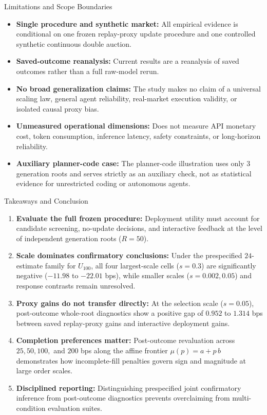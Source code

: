 \documentclass[10pt,aspectratio=169]{beamer}
\begin{document}
\begin{frame}{Limitations and Scope Boundaries}
  \begin{itemize}
    \item \textbf{Single procedure and synthetic market:} All empirical evidence is conditional on one frozen replay-proxy update procedure and one controlled synthetic continuous double auction.
    \item \textbf{Saved-outcome reanalysis:} Current results are a reanalysis of saved outcomes rather than a full raw-model rerun.
    \item \textbf{No broad generalization claims:} The study makes no claim of a universal scaling law, general agent reliability, real-market execution validity, or isolated causal proxy bias.
    \item \textbf{Unmeasured operational dimensions:} Does not measure API monetary cost, token consumption, inference latency, safety constraints, or long-horizon reliability.
    \item \textbf{Auxiliary planner-code case:} The planner-code illustration uses only $3$ generation roots and serves strictly as an auxiliary check, not as statistical evidence for unrestricted coding or autonomous agents.
  \end{itemize}
\end{frame}

\begin{frame}{Takeaways and Conclusion}
  \begin{enumerate}
    \item \textbf{Evaluate the full frozen procedure:} Deployment utility must account for candidate screening, no-update decisions, and interactive feedback at the level of independent generation roots ($R=50$).
    \item \textbf{Scale dominates confirmatory conclusions:} Under the prespecified $24$-estimate family for $U_{100}$, all four largest-scale cells ($s=0.3$) are significantly negative ($-11.98$ to $-22.01$ bps), while smaller scales ($s=0.002, 0.05$) and response contrasts remain unresolved.
    \item \textbf{Proxy gains do not transfer directly:} At the selection scale ($s=0.05$), post-outcome whole-root diagnostics show a positive gap of $0.952$ to $1.314$ bps between saved replay-proxy gains and interactive deployment gains.
    \item \textbf{Completion preferences matter:} Post-outcome revaluation across $25, 50, 100,$ and $200$ bps along the affine frontier $\mu(p) = a + p\,b$ demonstrates how incomplete-fill penalties govern sign and magnitude at large order scales.
    \item \textbf{Disciplined reporting:} Distinguishing prespecified joint confirmatory inference from post-outcome diagnostics prevents overclaiming from multi-condition evaluation suites.
  \end{enumerate}
\end{frame}
\end{document}
